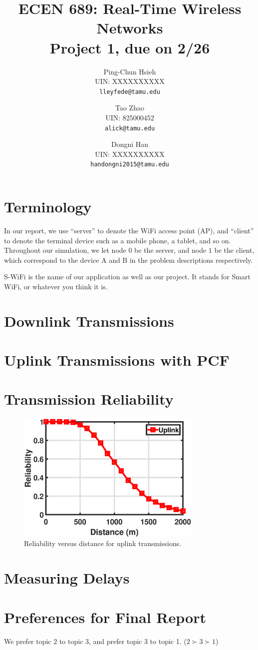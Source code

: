 \documentclass{article}
\begin{document}
\title{ECEN 689: Real-Time Wireless Networks\\ Project 1, due on 2/26}
\date{}
\author{%
Ping-Chun Hsieh\\
UIN: XXXXXXXXXX\\
\texttt{lleyfede@tamu.edu}
\and
Tao Zhao\\
UIN: 825000452\\
\texttt{alick@tamu.edu}
\and
Dongni Han\\
UIN: XXXXXXXXXX\\
\texttt{handongni2015@tamu.edu}
}
\maketitle

\section*{Terminology}

In our report, we use ``server'' to denote the WiFi access point (AP), and
``client'' to denote the terminal device such as a mobile phone, a tablet, and
so on. Throughout our simulation, we let node $0$ be the server, and node $1$ be
the client, which correspond to the device A and B in the problem descriptions
respectively.

S-WiFi is the name of our application as well as our project. It stands for
Smart WiFi, or whatever you think it is.

\section{Downlink Transmissions}
\section{Uplink Transmissions with PCF}
\section{Transmission Reliability}

\begin{figure}[h]
\centering
\includegraphics[width=3.5in]{p3_uplink.eps}
\caption{Reliability versus distance for uplink transmissions.}
\end{figure}

\section{Measuring Delays}
\section{Preferences for Final Report}
We prefer topic 2 to topic 3, and prefer topic 3 to topic 1. ($2 \succ 3 \succ 1$)
\end{document}
